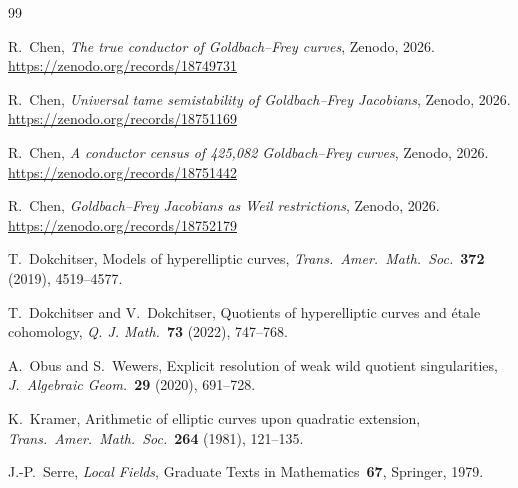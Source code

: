 \documentclass[11pt,a4paper]{article}
\theoremstyle{definition}
\theoremstyle{remark}
\begin{document}
\begin{thebibliography}{99}

R.~Chen,
\emph{The true conductor of Goldbach--Frey curves},
Zenodo, 2026.  \url{https://zenodo.org/records/18749731}

R.~Chen,
\emph{Universal tame semistability of Goldbach--Frey Jacobians},
Zenodo, 2026.  \url{https://zenodo.org/records/18751169}

R.~Chen,
\emph{A conductor census of 425,082 Goldbach--Frey curves},
Zenodo, 2026.  \url{https://zenodo.org/records/18751442}

R.~Chen,
\emph{Goldbach--Frey Jacobians as Weil restrictions},
Zenodo, 2026.  \url{https://zenodo.org/records/18752179}

T.~Dokchitser,
Models of hyperelliptic curves,
\emph{Trans.\ Amer.\ Math.\ Soc.}~\textbf{372} (2019),
4519--4577.

T.~Dokchitser and V.~Dokchitser,
Quotients of hyperelliptic curves and \'etale cohomology,
\emph{Q. J. Math.}~\textbf{73} (2022), 747--768.

A.~Obus and S.~Wewers,
Explicit resolution of weak wild quotient singularities,
\emph{J.\ Algebraic Geom.}~\textbf{29} (2020), 691--728.

K.~Kramer,
Arithmetic of elliptic curves upon quadratic extension,
\emph{Trans.\ Amer.\ Math.\ Soc.}~\textbf{264} (1981),
121--135.

J.-P.~Serre,
\emph{Local Fields},
Graduate Texts in Mathematics~\textbf{67},
Springer, 1979.

\end{thebibliography}
\end{document}
